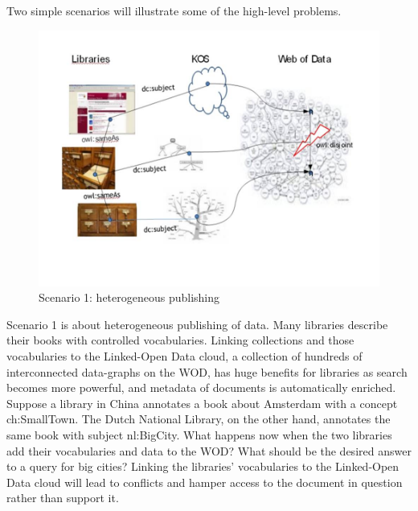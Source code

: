 \documentclass[letterpaper]{article}
\begin{document}
Two simple scenarios will illustrate some of the high-level problems.

\begin{figure}[t]
\includegraphics[width=\linewidth]{scenario1}
\caption{Scenario 1: heterogeneous publishing}
	\label{fig:ontograph}
\end{figure}

Scenario 1 is about heterogeneous publishing of data. Many libraries describe their books with controlled vocabularies. Linking collections and those vocabularies to the Linked-Open Data cloud, a collection of hundreds of interconnected data-graphs on the WOD, has huge benefits for libraries as search becomes more powerful, and metadata of documents is automatically enriched. Suppose a library in China annotates a book about Amsterdam with a concept ch:SmallTown. The Dutch National Library, on the other hand, annotates the same book with subject nl:BigCity. What happens now when the two libraries add their vocabularies and data to the WOD? What should be the desired answer to a query for big cities? Linking the libraries' vocabularies to the Linked-Open Data cloud will lead to conflicts and hamper access to the document in question rather than support it.
\end{document}
